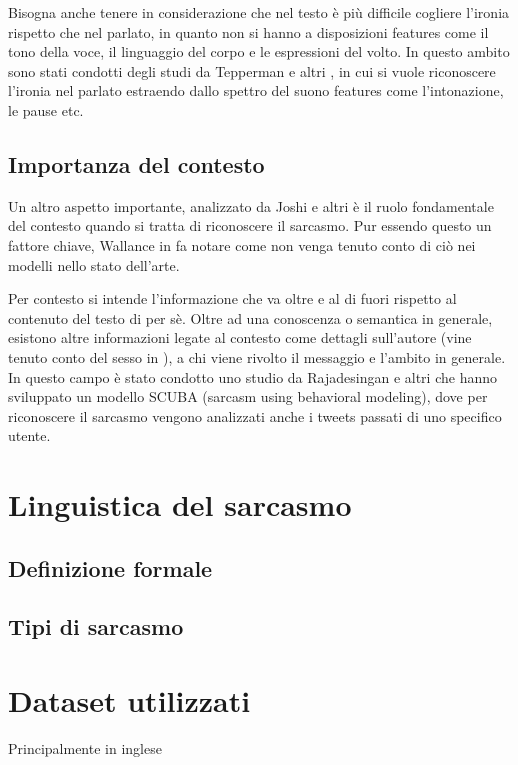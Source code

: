 \documentclass[oneside]{book}
\begin{document}
Bisogna anche tenere in considerazione che nel testo è più difficile cogliere l'ironia rispetto che nel parlato, in quanto non si hanno a disposizioni features come il tono della voce, il linguaggio del corpo e le espressioni del volto. In questo ambito sono stati condotti degli studi da Tepperman e altri \cite{audio-sarcasm}, in cui si vuole riconoscere l'ironia nel parlato estraendo dallo spettro del suono features come l'intonazione, le pause etc.

\subsection{Importanza del contesto}
Un altro aspetto importante, analizzato da Joshi e altri \cite{survey5} è il ruolo fondamentale del contesto quando si tratta di riconoscere il sarcasmo. Pur essendo questo un fattore chiave, Wallance in \cite{survey4} fa notare come non venga tenuto conto di ciò nei modelli nello stato dell'arte.

Per contesto si intende l'informazione che va oltre e al di fuori rispetto al contenuto del testo di per sè. Oltre ad una conoscenza o semantica in generale, esistono altre informazioni legate al contesto come dettagli sull'autore (vine tenuto conto del sesso in \cite{audio-sarcasm}), a chi viene rivolto il messaggio e l'ambito in generale. In questo campo è stato condotto uno studio da Rajadesingan e altri \cite{scuba} che hanno sviluppato un modello SCUBA (sarcasm using behavioral modeling), dove per riconoscere il sarcasmo vengono analizzati anche i tweets passati di uno specifico utente.



\section{Linguistica del sarcasmo}
\subsection{Definizione formale}
\subsection{Tipi di sarcasmo}

\section{Dataset utilizzati}

Principalmente in inglese
\end{document}
